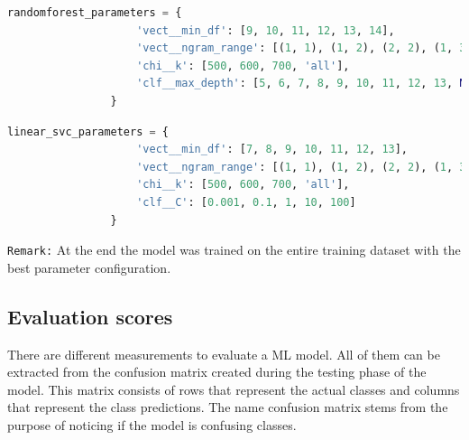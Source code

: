 \begin{lstlisting}[language=Python, caption=Tuned hyperparameters of the Random Forest fitting algorithm, label=coderandomForestparameters]
randomforest_parameters = {
                    'vect__min_df': [9, 10, 11, 12, 13, 14],
                    'vect__ngram_range': [(1, 1), (1, 2), (2, 2), (1, 3)],
                    'chi__k': [500, 600, 700, 'all'],
                    'clf__max_depth': [5, 6, 7, 8, 9, 10, 11, 12, 13, None]
                }
\end{lstlisting}

\begin{lstlisting}[language=Python, caption=Tuned hyperparameters of the linearSVC fitting algorithm, label=codelinearsvcparameters]
linear_svc_parameters = {
                    'vect__min_df': [7, 8, 9, 10, 11, 12, 13],
                    'vect__ngram_range': [(1, 1), (1, 2), (2, 2), (1, 3)],
                    'chi__k': [500, 600, 700, 'all'],
                    'clf__C': [0.001, 0.1, 1, 10, 100]
                }
\end{lstlisting}

\texttt{Remark:} At the end the model was trained on the entire training dataset with the best parameter configuration.\\

\subsection{Evaluation scores} \label{ml_evaluation_scores}
There are different measurements to evaluate a ML model. All of them can be extracted from the confusion matrix created during the testing phase of the model. This matrix consists of rows that represent the actual classes and columns that represent the class predictions. The name confusion matrix stems from the purpose of noticing if the model is confusing classes.

